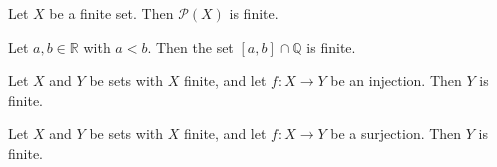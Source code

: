 \begin{chapex} %
Let $X$ be a finite set. Then $\mathcal{P}(X)$ is finite.
\end{chapex}

\begin{chapex} %
Let $a,b \in \mathbb{R}$ with $a<b$. Then the set $[a,b] \cap \mathbb{Q}$ is finite.
\end{chapex}

\begin{chapex} %
Let $X$ and $Y$ be sets with $X$ finite, and let $f : X \to Y$ be an injection. Then $Y$ is finite.
\end{chapex}

\begin{chapex} %
\label{cqCombinatoricsASNEnd}
Let $X$ and $Y$ be sets with $X$ finite, and let $f : X \to Y$ be a surjection. Then $Y$ is finite.
\end{chapex}
